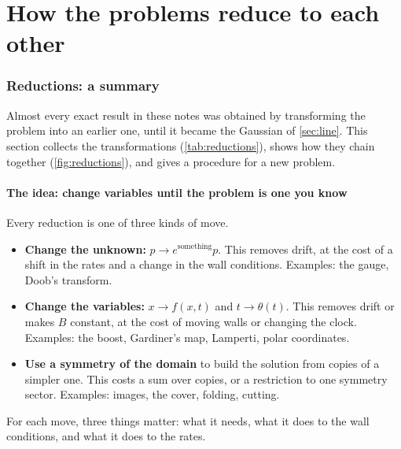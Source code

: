 \documentclass[11pt]{article}
\numberwithin{equation}{section}
\begin{document}
\part{How the problems reduce to each other}
\label{part:reductions}

\section{Reductions: a summary}
\label{sec:reductions}

Almost every exact result in these notes was obtained by transforming the problem into an earlier one, until it
became the Gaussian of \cref{sec:line}. This section collects the transformations
(\cref{tab:reductions}), shows how they chain together (\cref{fig:reductions}), and gives a procedure for a new
problem.

\subsection{The idea: change variables until the problem is one you know}

Every reduction is one of three kinds of move.
\begin{itemize}
  \item \textbf{Change the unknown:} $p\to e^{\text{something}}p$. This removes drift, at the cost of a shift in
        the rates and a change in the wall conditions. Examples: the gauge, Doob's transform.
  \item \textbf{Change the variables:} $x\to f(x,t)$ and $t\to\theta(t)$. This removes drift or makes $B$ constant,
        at the cost of moving walls or changing the clock. Examples: the boost, Gardiner's map, Lamperti, polar
        coordinates.
  \item \textbf{Use a symmetry of the domain} to build the solution from copies of a simpler one. This costs a sum
        over copies, or a restriction to one symmetry sector. Examples: images, the cover, folding, cutting.
\end{itemize}
For each move, three things matter: what it needs, what it does to the wall conditions, and what it does to the
rates.
\end{document}
